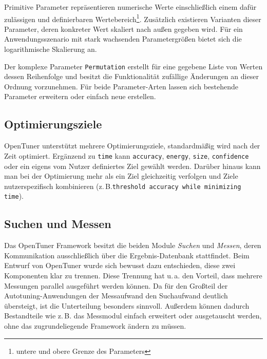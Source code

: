 \documentclass[a4paper,11pt]{scrartcl}
\newcommand{\zB}{\mbox{z.\,B.}\xspace}
\newcommand{\ua}{\mbox{u.\,a.}\xspace}
\begin{document}
Primitive Parameter repräsentieren numerische Werte einschließlich einem dafür
zulässigen und definierbaren Wertebereich\footnote{untere und obere Grenze des Parameters}. 
Zusätzlich existieren Varianten dieser Parameter,
deren konkreter Wert skaliert nach außen gegeben wird. Für ein Anwendungsszenario mit 
stark wachsenden Parametergrößen bietet sich die logarithmische Skalierung an. \newline

Der komplexe Parameter \texttt{Permutation} erstellt für eine gegebene Liste von Werten dessen 
Reihenfolge und besitzt die Funktionalität zufällige Änderungen an dieser Ordnung vorzunehmen.
Für beide Parameter-Arten lassen sich bestehende Parameter erweitern oder einfach neue erstellen.

\subsection{Optimierungsziele}

OpenTuner unterstützt mehrere Optimierungsziele, standardmäßig wird nach der Zeit optimiert.
Ergänzend zu \texttt{time} kann \texttt{accuracy}, \texttt{energy}, \texttt{size}, 
\texttt{confidence} oder ein eigens vom Nutzer definiertes Ziel gewählt werden.
Darüber hinaus kann man bei der Optimierung mehr als ein Ziel gleichzeitig verfolgen und
Ziele nutzerspezifisch kombinieren (\zB \texttt{threshold accuracy  while
minimizing time}). 

\subsection{Suchen und Messen}

Das OpenTuner Framework besitzt die beiden Module \emph{Suchen} und \emph{Messen},
deren Kommunikation ausschließlich über die Ergebnis-Datenbank stattfindet.
Beim Entwurf von OpenTuner wurde sich bewusst dazu entschieden, diese zwei Komponenten
klar zu trennen. Diese Trennung hat \ua den Vorteil, dass mehrere Messungen parallel 
ausgeführt werden können. Da für den Großteil der Autotuning-Anwendungen der Messaufwand
den Suchaufwand deutlich übersteigt, ist die Unterteilung besonders sinnvoll.
Außerdem können dadurch Bestandteile wie \zB das Messmodul einfach erweitert oder 
ausgetauscht werden, ohne das zugrundeliegende Framework ändern zu müssen.


\end{document}
